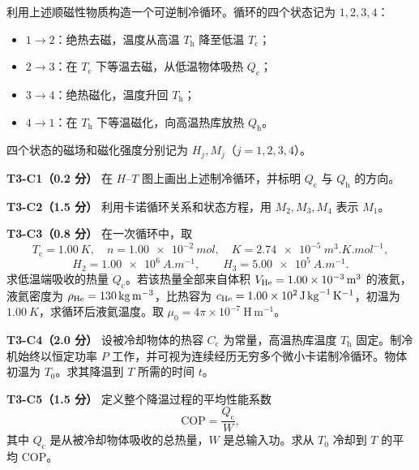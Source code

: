 \documentclass[UTF8,11pt,a4paper,fontset=fandol]{ctexart}
\begin{document}
\begin{problembox}
利用上述顺磁性物质构造一个可逆制冷循环。循环的四个状态记为 $1,2,3,4$：
\begin{itemize}
  \item $1\to2$：绝热去磁，温度从高温 $T_{\mathrm h}$ 降至低温 $T_{\mathrm c}$；
  \item $2\to3$：在 $T_{\mathrm c}$ 下等温去磁，从低温物体吸热 $Q_{\mathrm c}$；
  \item $3\to4$：绝热磁化，温度升回 $T_{\mathrm h}$；
  \item $4\to1$：在 $T_{\mathrm h}$ 下等温磁化，向高温热库放热 $Q_{\mathrm h}$。
\end{itemize}
四个状态的磁场和磁化强度分别记为 $H_j,M_j$（$j=1,2,3,4$）。

\textbf{T3-C1（0.2 分）} 在 $H$--$T$ 图上画出上述制冷循环，并标明 $Q_{\mathrm c}$ 与 $Q_{\mathrm h}$ 的方向。

\textbf{T3-C2（1.5 分）} 利用卡诺循环关系和状态方程，用 $M_2,M_3,M_4$ 表示 $M_1$。

\textbf{T3-C3（0.8 分）} 在一次循环中，取
\[
T_{\mathrm c}=\SI{1.00}{K},\quad
n=\SI{1.00e-2}{mol},\quad
K=\SI{2.74e-5}{m^3.K.mol^{-1}},
\]
\[
H_2=\SI{1.00e6}{A.m^{-1}},\qquad
H_3=\SI{5.00e5}{A.m^{-1}}.
\]
求低温端吸收的热量 $Q_{\mathrm c}$。若该热量全部来自体积
$V_{\rm He}=\SI{1.00e-3}{m^3}$ 的液氦，液氦密度为
$\rho_{\rm He}=\SI{130}{kg.m^{-3}}$，比热容为
$c_{\rm He}=\SI{1.00e2}{J.kg^{-1}.K^{-1}}$，初温为 $\SI{1.00}{K}$，求循环后液氦温度。取 $\mu_0=4\pi\times10^{-7}\ \mathrm{H\,m^{-1}}$。

\textbf{T3-C4（2.0 分）} 设被冷却物体的热容 $C_{\mathrm c}$ 为常量，高温热库温度 $T_{\mathrm h}$ 固定。制冷机始终以恒定功率 $P$ 工作，并可视为连续经历无穷多个微小卡诺制冷循环。物体初温为 $T_0$。求其降温到 $T$ 所需的时间 $t$。

\textbf{T3-C5（1.5 分）} 定义整个降温过程的平均性能系数
\[
\mathrm{COP}=\frac{Q_{\mathrm c}}{W},
\]
其中 $Q_{\mathrm c}$ 是从被冷却物体吸收的总热量，$W$ 是总输入功。求从 $T_0$ 冷却到 $T$ 的平均 $\mathrm{COP}$。
\end{problembox}
\end{document}
